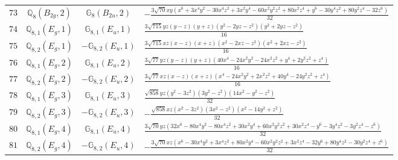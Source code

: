 \documentclass[fleqn,8pt,landscape]{jsarticle}
\begin{document}
\begin{table}[ht!]
\begin{center}
\begin{tabular}{cccl}
$ 73 $ & $ \mathbb{Q}_{8}(B_{2g},2) $ & $ \mathbb{G}_{8}(B_{2u},2) $ & $ - \frac{3 \sqrt{70} x y \left(x^{6} + 3 x^{4} y^{2} - 30 x^{4} z^{2} + 3 x^{2} y^{4} - 60 x^{2} y^{2} z^{2} + 80 x^{2} z^{4} + y^{6} - 30 y^{4} z^{2} + 80 y^{2} z^{4} - 32 z^{6}\right)}{32} $ \\
$ 74 $ & $ \mathbb{Q}_{8,1}(E_{g},1) $ & $ \mathbb{G}_{8,1}(E_{u},1) $ & $ \frac{3 \sqrt{715} y z \left(y - z\right) \left(y + z\right) \left(y^{2} - 2 y z - z^{2}\right) \left(y^{2} + 2 y z - z^{2}\right)}{16} $ \\
$ 75 $ & $ \mathbb{Q}_{8,2}(E_{g},1) $ & $ -\mathbb{G}_{8,2}(E_{u},1) $ & $ \frac{3 \sqrt{715} x z \left(x - z\right) \left(x + z\right) \left(x^{2} - 2 x z - z^{2}\right) \left(x^{2} + 2 x z - z^{2}\right)}{16} $ \\
$ 76 $ & $ \mathbb{Q}_{8,1}(E_{g},2) $ & $ \mathbb{G}_{8,1}(E_{u},2) $ & $ \frac{3 \sqrt{77} y z \left(y - z\right) \left(y + z\right) \left(40 x^{4} - 24 x^{2} y^{2} - 24 x^{2} z^{2} + y^{4} + 2 y^{2} z^{2} + z^{4}\right)}{16} $ \\
$ 77 $ & $ \mathbb{Q}_{8,2}(E_{g},2) $ & $ -\mathbb{G}_{8,2}(E_{u},2) $ & $ \frac{3 \sqrt{77} x z \left(x - z\right) \left(x + z\right) \left(x^{4} - 24 x^{2} y^{2} + 2 x^{2} z^{2} + 40 y^{4} - 24 y^{2} z^{2} + z^{4}\right)}{16} $ \\
$ 78 $ & $ \mathbb{Q}_{8,1}(E_{g},3) $ & $ \mathbb{G}_{8,1}(E_{u},3) $ & $ \frac{\sqrt{858} y z \left(y^{2} - 3 z^{2}\right) \left(3 y^{2} - z^{2}\right) \left(14 x^{2} - y^{2} - z^{2}\right)}{32} $ \\
$ 79 $ & $ \mathbb{Q}_{8,2}(E_{g},3) $ & $ -\mathbb{G}_{8,2}(E_{u},3) $ & $ - \frac{\sqrt{858} x z \left(x^{2} - 3 z^{2}\right) \left(3 x^{2} - z^{2}\right) \left(x^{2} - 14 y^{2} + z^{2}\right)}{32} $ \\
$ 80 $ & $ \mathbb{Q}_{8,1}(E_{g},4) $ & $ \mathbb{G}_{8,1}(E_{u},4) $ & $ \frac{3 \sqrt{70} y z \left(32 x^{6} - 80 x^{4} y^{2} - 80 x^{4} z^{2} + 30 x^{2} y^{4} + 60 x^{2} y^{2} z^{2} + 30 x^{2} z^{4} - y^{6} - 3 y^{4} z^{2} - 3 y^{2} z^{4} - z^{6}\right)}{32} $ \\
$ 81 $ & $ \mathbb{Q}_{8,2}(E_{g},4) $ & $ -\mathbb{G}_{8,2}(E_{u},4) $ & $ - \frac{3 \sqrt{70} x z \left(x^{6} - 30 x^{4} y^{2} + 3 x^{4} z^{2} + 80 x^{2} y^{4} - 60 x^{2} y^{2} z^{2} + 3 x^{2} z^{4} - 32 y^{6} + 80 y^{4} z^{2} - 30 y^{2} z^{4} + z^{6}\right)}{32} $ \\
 \hline \hline
\end{tabular}
\end{center}
\end{table}
\end{document}

